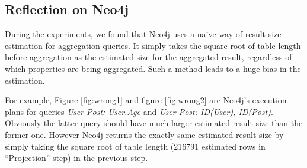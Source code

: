 \subsection{Reflection on Neo4j}
During the experiments, we found that Neo4j uses a na\"ive way of result size estimation for aggregation queries. It simply takes the square root of table length before aggregation as the estimated size for the aggregated result, regardless of which properties are being aggregated. Such a method leads to a huge bias in the estimation.

For example, Figure \ref{fig:wrong1} and figure \ref{fig:wrong2} are Neo4j's execution plans for queries \textit{User-Post: User.Age} and \textit{User-Post: ID(User), ID(Post)}. Obviously the latter query should have much larger estimated result size than the former one. However Neo4j returns the exactly same estimated result size by simply taking the square root of table length (216791 estimated rows in ``Projection'' step) in the previous step.


